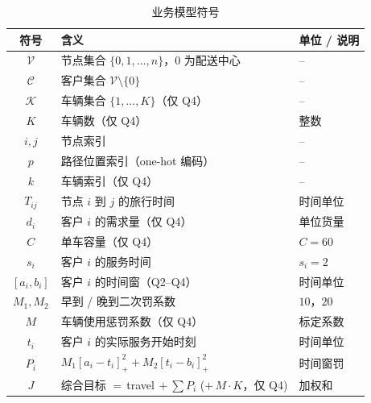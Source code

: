 \documentclass[UTF8,12pt,a4paper]{ctexart}
\begin{document}
\begin{table}[H]
    \centering
    \caption{业务模型符号}
    \label{tab:sym-biz}
    \begin{tabular}{c l l}
        \toprule
        符号 & 含义 & 单位 / 说明 \\
        \midrule
        $\mathcal V$  & 节点集合 $\{0,1,\dots,n\}$，$0$ 为配送中心 & -- \\
        $\mathcal C$  & 客户集合 $\mathcal V\setminus\{0\}$         & -- \\
        $\mathcal K$  & 车辆集合 $\{1,\dots,K\}$（仅 Q4）           & -- \\
        $K$           & 车辆数（仅 Q4）                              & 整数 \\
        $i,j$         & 节点索引                                     & -- \\
        $p$           & 路径位置索引（one-hot 编码）                  & -- \\
        $k$           & 车辆索引（仅 Q4）                            & -- \\
        $T_{ij}$      & 节点 $i$ 到 $j$ 的旅行时间                   & 时间单位 \\
        $d_i$         & 客户 $i$ 的需求量（仅 Q4）                   & 单位货量 \\
        $C$           & 单车容量（仅 Q4）                            & $C=60$ \\
        $s_i$         & 客户 $i$ 的服务时间                           & $s_i=2$ \\
        $[a_i,b_i]$   & 客户 $i$ 的时间窗（Q2--Q4）                  & 时间单位 \\
        $M_1,M_2$     & 早到 / 晚到二次罚系数                        & $10$，$20$ \\
        $M$           & 车辆使用惩罚系数（仅 Q4）                    & 标定系数 \\
        $t_i$         & 客户 $i$ 的实际服务开始时刻                   & 时间单位 \\
        $P_i$         & $M_1[a_i\!-\!t_i]_+^2+M_2[t_i\!-\!b_i]_+^2$  & 时间窗罚 \\
        $J$           & 综合目标 $=\,$travel$\,+\sum P_i$ ($+\,M\!\cdot\!K$，仅 Q4) & 加权和 \\
        \bottomrule
    \end{tabular}
\end{table}
\end{document}
